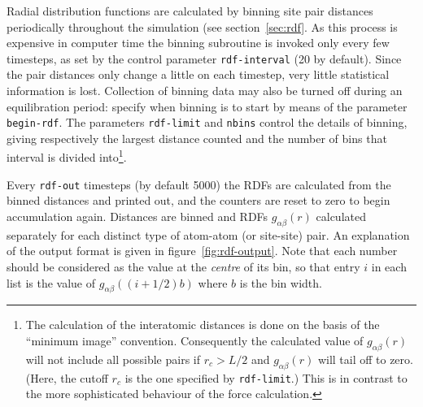 Radial distribution functions are calculated by binning site pair
distances periodically throughout the simulation (see
section~\ref{sec:rdf}.  As this process is expensive in computer time
the binning subroutine is invoked only every few timesteps, as set by
the control parameter \verb'rdf-interval' (20 by default).  Since the
pair distances only change a little on each timestep, very little
statistical information is lost.  Collection of binning data may also
be turned off during an equilibration period: specify when binning is
to start by means of the parameter \verb'begin-rdf'.  The parameters
\verb'rdf-limit' and \verb'nbins' control the details of binning,
giving respectively the largest distance counted and the number of
bins that interval is divided into\footnote{The calculation of the
interatomic distances is done on the basis of the ``minimum image''
convention.  Consequently the calculated value of $g_{\alpha\beta}(r)$
will not include all possible pairs if $r_c > L/2$ and
$g_{\alpha\beta}(r)$ will tail off to zero.  (Here, the cutoff $r_c$ is
the one specified by \verb'rdf-limit'.)  This is in contrast to the
more sophisticated behaviour of the force calculation.}.

Every \verb'rdf-out' timesteps (by default 5000) the RDFs are
calculated from the binned distances and printed out, and the counters
are reset to zero to begin accumulation again.  Distances are binned
and RDFs $g_{\alpha \beta}(r)$ calculated separately for each distinct
type of atom-atom (or site-site) pair.  An explanation of the output
format is given in figure~\ref{fig:rdf-output}.  Note that each number
should be considered as the value at the {\em centre\/} of its bin, so
that entry $i$ in each list is the value of
$g_{\alpha\beta}((i+1/2)b)$ where $b$ is the bin width.

